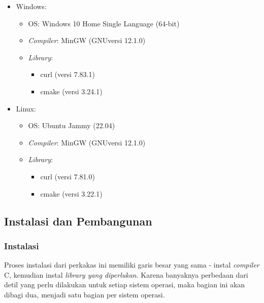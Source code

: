 \begin{itemize}
	\item Windows:
	
	\begin{itemize}
		\item OS: Windows 10 Home Single Language (64-bit)
		\item \textit{Compiler}: MinGW (GNU\textemdash versi 12.1.0)
		\item \textit{Library}:
		
		\begin{itemize}
			\item curl (versi 7.83.1)
			\item cmake (versi 3.24.1)
		\end{itemize}
		
	\end{itemize}
	
	\item Linux:
	
	\begin{itemize}
		\item OS: Ubuntu Jammy (22.04)
		\item \textit{Compiler}: MinGW (GNU\textemdash versi 12.1.0)
		\item \textit{Library}:
		
		\begin{itemize}
			\item curl (versi 7.81.0)
			\item cmake (versi 3.22.1)
		\end{itemize}
		
	\end{itemize}
	
\end{itemize}

\subsection{Instalasi dan Pembangunan}
\label{sec:testing-implementation-usage}

\subsubsection{Instalasi}
\label{sec:testing-implementation-usage-instalation}

Proses instalasi dari perkakas ini memiliki garis besar yang sama - instal \textit{compiler} C, kemudian instal \textit{library yang diperlukan}. Karena banyaknya perbedaan dari detil yang perlu dilakukan untuk setiap sistem operasi, maka bagian ini akan dibagi dua, menjadi satu bagian per sistem operasi.

